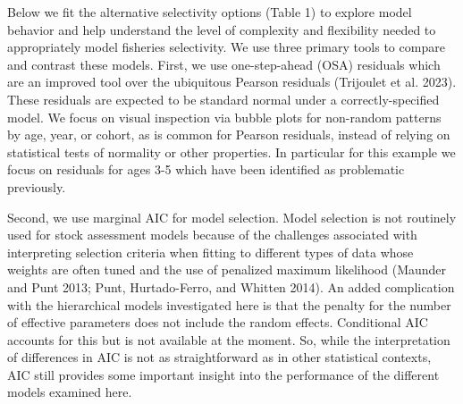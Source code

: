 \documentclass[
]{article}
\begin{document}
Below we fit the alternative selectivity options (Table 1) to explore
model behavior and help understand the level of complexity and
flexibility needed to appropriately model fisheries selectivity. We use
three primary tools to compare and contrast these models. First, we use
one-step-ahead (OSA) residuals which are an improved tool over the
ubiquitous Pearson residuals (Trijoulet et al. 2023). These residuals
are expected to be standard normal under a correctly-specified model. We
focus on visual inspection via bubble plots for non-random patterns by
age, year, or cohort, as is common for Pearson residuals, instead of
relying on statistical tests of normality or other properties. In
particular for this example we focus on residuals for ages 3-5 which
have been identified as problematic previously.

Second, we use marginal AIC for model selection. Model selection is not
routinely used for stock assessment models because of the challenges
associated with interpreting selection criteria when fitting to
different types of data whose weights are often tuned and the use of
penalized maximum likelihood (Maunder and Punt 2013; Punt,
Hurtado-Ferro, and Whitten 2014). An added complication with the
hierarchical models investigated here is that the penalty for the number
of effective parameters does not include the random effects. Conditional
AIC accounts for this but is not available at the moment. So, while the
interpretation of differences in AIC is not as straightforward as in
other statistical contexts, AIC still provides some important insight
into the performance of the different models examined here.
\end{document}
